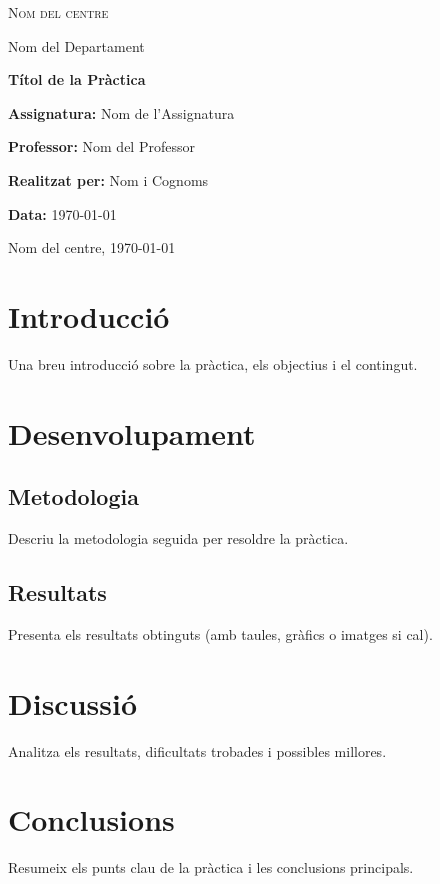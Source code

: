 \documentclass[a4paper,12pt]{article}
\newcommand{\titol}{Títol de la Pràctica}
\newcommand{\nomestudiant}{Nom i Cognoms}
\newcommand{\assignatura}{Nom de l'Assignatura}
\newcommand{\professor}{Nom del Professor}
\newcommand{\universitat}{Nom del centre}
\newcommand{\departament}{Nom del Departament}
\newcommand{\data}{\today}
\begin{document}
\begin{titlepage}
    \centering
    {\scshape\Large \universitat \par}
    {\large \departament \par}
    \vspace{2cm}
    {\Huge\bfseries \titol \par}
    \vspace{1cm}
    \textbf{Assignatura:} \assignatura \par
    \textbf{Professor:} \professor \par
    \vspace{1.5cm}
    \textbf{Realitzat per:} \nomestudiant \par
    \textbf{Data:} \data \par
    \vfill
    {\large \universitat, \data \par}
\end{titlepage}


\newpage
\tableofcontents
\newpage


\section{Introducció}
Una breu introducció sobre la pràctica, els objectius i el contingut.

\section{Desenvolupament}
\subsection{Metodologia}
Descriu la metodologia seguida per resoldre la pràctica.
\subsection{Resultats}
Presenta els resultats obtinguts (amb taules, gràfics o imatges si cal).

\section{Discussió}
Analitza els resultats, dificultats trobades i possibles millores.

\section{Conclusions}
Resumeix els punts clau de la pràctica i les conclusions principals.
\end{document}
